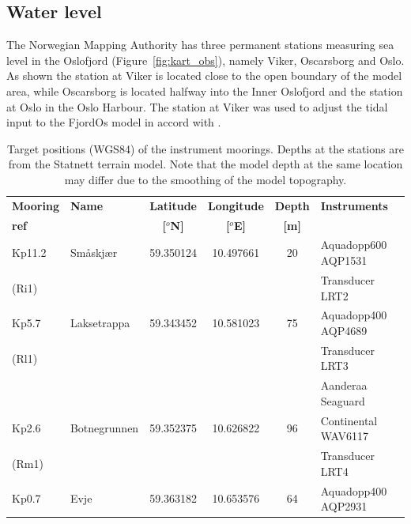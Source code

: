 \subsection{Water level}
\label{subsec:wlevelo}
The Norwegian Mapping Authority has three permanent stations measuring sea level in the Oslofjord (Figure~\ref{fig:kart_obs}), namely Viker, Oscarsborg and Oslo. As shown the station at Viker is located close to the open boundary of the model area, while Oscarsborg is located halfway into the Inner Oslofjord and the station at Oslo in the Oslo Harbour. The station at Viker was used to adjust the tidal input to the FjordOs model in accord with \cite{hjelm:etal:2017}.

\begin{table}[hb] 
\caption{\small Target positions (WGS84) of the instrument moorings. Depths at the stations are from the Statnett terrain model. Note that the model depth at the same location may differ due to the smoothing of the model topography.} 
\label{tab:Statnett} 
\centering 
\begin{tabular}{|llcccl|} 
\hline  
\small{{\bf Mooring}} & \small{{\bf Name}} & \small{{\bf Latitude}} & \small{{\bf Longitude}} & \small{{\bf Depth}} & \small{{\bf Instruments}}\\ 
\small{{\bf ref}}    &		           & \small{{\bf [$^o$N]}}  & \small{{\bf [$^o$E]}}   & \small{{\bf [m]}} &	\\ \hline
\small{Kp11.2} & \small{Sm{\aa}skj{\ae}r} & \small{59.350124} & \small{10.497661} & \small{20}	& \small{Aquadopp600 AQP1531}	\\
\small{(Ri1)}  &                          &		      &			  &		& \small{Transducer LRT2}	\\ \hline
\small{Kp5.7}  & \small{Laksetrappa}      & \small{59.343452} & \small{10.581023} & \small{75}  & \small{Aquadopp400 AQP4689}	\\
\small{(Rl1)}  &			  &		      &			  &     	& \small{Transducer LRT3}	\\
	       &			  &		      &			  &     	& \small{Aanderaa Seaguard}	\\ \hline
\small{Kp2.6}  & \small{Botnegrunnen}     & \small{59.352375} & \small{10.626822} & \small{96}  & \small{Continental WAV6117}	\\
\small{(Rm1)}  &			  &		      &			  &     	& \small{Transducer LRT4}	\\ \hline
\small{Kp0.7}  & \small{Evje}             & \small{59.363182} & \small{10.653576} & \small{64}  & \small{Aquadopp400 AQP2931}	\\

\end{tabular}
\end{table}
